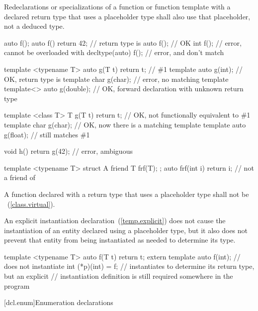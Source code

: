 Redeclarations or specializations of a function or function template with a
declared return type that uses a placeholder type shall also use that
placeholder, not a deduced type.
\enterexample
\begin{codeblock}
auto f();
auto f() { return 42; } // return type is 
auto f();               // OK
int f();                // error, cannot be overloaded with 
decltype(auto) f();     // error,  and  don't match

template <typename T> auto g(T t) { return t; } // \#1
template auto g(int);                           // OK, return type is 
template char g(char);                          // error, no matching template
template<> auto g(double);                      // OK, forward declaration with unknown return type

template <class T> T g(T t) { return t; } // OK, not functionally equivalent to \#1
template char g(char);                    // OK, now there is a matching template
template auto g(float);                   // still matches \#1

void h() { return g(42); } // error, ambiguous

template <typename T> struct A {
  friend T frf(T);
};
auto frf(int i) { return i; } // not a friend of 
\end{codeblock}
\exitexample

\pnum
A function declared with a return type that uses a placeholder type shall not
be ~(\ref{class.virtual}).

\pnum
An explicit instantiation declaration~(\ref{temp.explicit}) does not cause the
instantiation of an entity declared using a placeholder type, but it also does
not prevent that entity from being instantiated as needed to determine its
type.
\enterexample
\begin{codeblock}
template <typename T> auto f(T t) { return t; }
extern template auto f(int); // does not instantiate 
int (*p)(int) = f;           // instantiates  to determine its return type, but an explicit
                             // instantiation definition is still required somewhere in the program
\end{codeblock}
\exitexample

[dcl.enum]{Enumeration declarations}%
%
%

